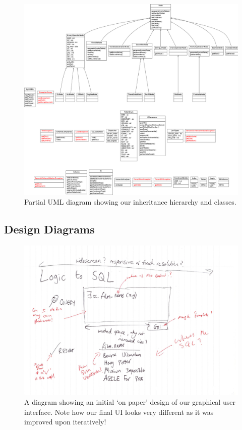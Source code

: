 \documentclass[a4paper, 11pt]{article}
\begin{document}
    \begin{figure}[H]
      \includegraphics[width=1.0\textwidth]{images/umlisloveley.png}
      \caption{Partial UML diagram showing our inheritance hierarchy and
        classes.}
    \end{figure}

  \subsection{Design Diagrams}
    \begin{figure}[H]
      \includegraphics[width=1.0\textwidth]{images/ui_design.jpg}
      \caption{A diagram showing an initial `on paper' design of our graphical
        user interface. Note how our final UI looks very different as it was
      improved upon iteratively!}
    \end{figure}
\end{document}

